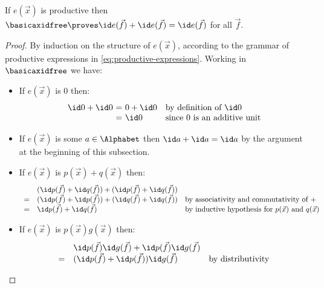 \begin{lemma}
\label{idem-trans-is-idem-on-prod-exprs}
    If $e(\vec x)$ is productive then $\basicaxidfree \proves \id e(\vec f) + \id e(\vec f) = \id e(\vec f)$ for all $\vec f$.
\end{lemma}
\begin{proof}
    By induction on the structure of $e(\vec x)$, according to the grammar of productive expressions in \eqref{eq:productive-expressions}.
    Working in $\basicaxidfree$ we have:
    \begin{itemize}
        \item If $e(\vec x)$ is $0$ then: 
        \[
        \begin{array}{r@{\ = \ }ll}
             \id 0 + \id 0 & 0 + \id 0 & \text{by definition of $\id 0$} \\
                & \id 0 & \text{since $0$ is an additive unit}
        \end{array}
        \]
        \item If $e(\vec x)$ is some $a\in \Alphabet$ then $\id a + \id a = \id a$ by the argument at the beginning of this subsection.
        \item If $e(\vec x)$ is $p(\vec x) +  q(\vec x) $ then:
        \[
        \begin{array}{rll}
        & (\id p(\vec f) + \id q(\vec f)) + (\id p(\vec f) + \id q(\vec f)) & 
        \\
          =& (\id p(\vec f) + \id p(\vec f)) + (\id q(\vec f) + \id q(\vec f)) & \text{by associativity and commutativity of $+$} \\
            =& \id p(\vec f) + \id q(\vec f) & \text{by inductive hypothesis for $p(\vec x)$ and $q(\vec x)$} 
        \end{array}
        \]
        \item If $e(\vec x)$ is $p(\vec x)g(\vec x)$ then:
        \[
        \begin{array}{rll}
        &  \id p(\vec f)\id g(\vec f) + \id p(\vec f) \id g(\vec f) & 
        \\
          =  & (\id p(\vec f) + \id p(\vec f))\id g(\vec f) & \text{by distributivity} \\

\end{array}\]
\end{itemize}
\end{proof}
